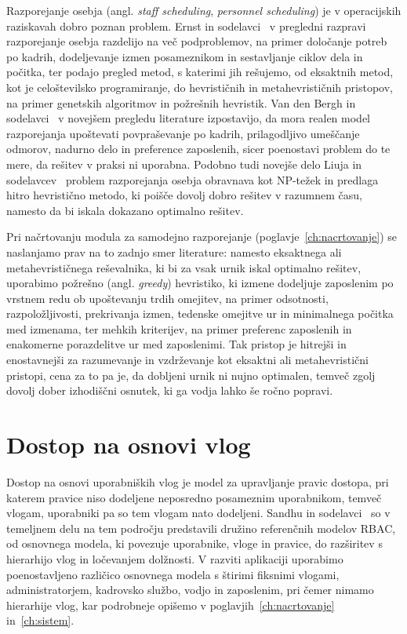 Razporejanje osebja (angl. \textit{staff scheduling}, \textit{personnel scheduling}) je v operacijskih raziskavah dobro poznan problem. Ernst in sodelavci~\cite{ernst2004staff} v pregledni razpravi razporejanje osebja razdelijo na več podproblemov, na primer določanje potreb po kadrih, dodeljevanje izmen posameznikom in sestavljanje ciklov dela in počitka, ter podajo pregled metod, s katerimi jih rešujemo, od eksaktnih metod, kot je celoštevilsko programiranje, do hevrističnih in metahevrističnih pristopov, na primer genetskih algoritmov in požrešnih hevristik. Van den Bergh in sodelavci~\cite{vandenbergh2013personnel} v novejšem pregledu literature izpostavijo, da mora realen model razporejanja upoštevati povpraševanje po kadrih, prilagodljivo umeščanje odmorov, nadurno delo in preference zaposlenih, sicer poenostavi problem do te mere, da rešitev v praksi ni uporabna. Podobno tudi novejše delo Liuja in sodelavcev~\cite{liu2024flexible} problem razporejanja osebja obravnava kot NP-težek in predlaga hitro hevristično metodo, ki poišče dovolj dobro rešitev v razumnem času, namesto da bi iskala dokazano optimalno rešitev.

Pri načrtovanju modula za samodejno razporejanje (poglavje~\ref{ch:nacrtovanje}) se naslanjamo prav na to zadnjo smer literature: namesto eksaktnega ali metahevrističnega reševalnika, ki bi za vsak urnik iskal optimalno rešitev, uporabimo požrešno (angl. \textit{greedy}) hevristiko, ki izmene dodeljuje zaposlenim po vrstnem redu ob upoštevanju trdih omejitev, na primer odsotnosti, razpoložljivosti, prekrivanja izmen, tedenske omejitve ur in minimalnega počitka med izmenama, ter mehkih kriterijev, na primer preferenc zaposlenih in enakomerne porazdelitve ur med zaposlenimi. Tak pristop je hitrejši in enostavnejši za razumevanje in vzdrževanje kot eksaktni ali metahevristični pristopi, cena za to pa je, da dobljeni urnik ni nujno optimalen, temveč zgolj dovolj dober izhodiščni osnutek, ki ga vodja lahko še ročno popravi.

\section{Dostop na osnovi vlog}
\label{sec:rbac-sorodna}

Dostop na osnovi uporabniških vlog je model za upravljanje pravic dostopa, pri katerem pravice niso dodeljene neposredno posameznim uporabnikom, temveč vlogam, uporabniki pa so tem vlogam nato dodeljeni. Sandhu in sodelavci~\cite{sandhu1996rbac} so v temeljnem delu na tem področju predstavili družino referenčnih modelov RBAC, od osnovnega modela, ki povezuje uporabnike, vloge in pravice, do razširitev s hierarhijo vlog in ločevanjem dolžnosti. V razviti aplikaciji uporabimo poenostavljeno različico osnovnega modela s štirimi fiksnimi vlogami, administratorjem, kadrovsko službo, vodjo in zaposlenim, pri čemer nimamo hierarhije vlog, kar podrobneje opišemo v poglavjih~\ref{ch:nacrtovanje} in~\ref{ch:sistem}.

